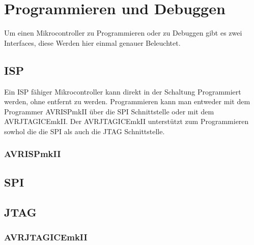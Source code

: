 \chapter{Programmieren und Debuggen}

Um einen Mikrocontroller zu Programmieren oder zu Debuggen gibt es zwei
Interfaces, diese Werden hier einmal genauer Beleuchtet.

\section{ISP}

Ein \ac{ISP} fähiger Mikrocontroller kann direkt in der Schaltung Programmiert
werden, ohne entfernt zu werden. Programmieren kann man entweder mit dem
Programmer AVRISPmkII über die \acs{SPI} Schnittstelle oder mit dem  
AVRJTAGICEmkII. Der AVRJTAGICEmkII unterstützt zum Programmieren sowhol die
die \acs{SPI} als auch die \acs{JTAG} Schnittstelle.

\subsection{AVRISPmkII}

\section{SPI}



\section{JTAG}

\subsection{AVRJTAGICEmkII}